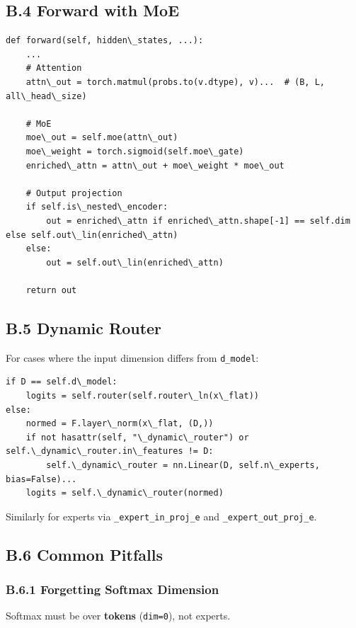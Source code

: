 \subsection{B.4 Forward with MoE}

\begin{lstlisting}
def forward(self, hidden\_states, ...):
    ...
    # Attention
    attn\_out = torch.matmul(probs.to(v.dtype), v)...  # (B, L, all\_head\_size)
    
    # MoE
    moe\_out = self.moe(attn\_out)
    moe\_weight = torch.sigmoid(self.moe\_gate)
    enriched\_attn = attn\_out + moe\_weight * moe\_out
    
    # Output projection
    if self.is\_nested\_encoder:
        out = enriched\_attn if enriched\_attn.shape[-1] == self.dim else self.out\_lin(enriched\_attn)
    else:
        out = self.out\_lin(enriched\_attn)
    
    return out
\end{lstlisting}

\subsection{B.5 Dynamic Router}

For cases where the input dimension differs from \texttt{d\_model}:

\begin{lstlisting}
if D == self.d\_model:
    logits = self.router(self.router\_ln(x\_flat))
else:
    normed = F.layer\_norm(x\_flat, (D,))
    if not hasattr(self, "\_dynamic\_router") or self.\_dynamic\_router.in\_features != D:
        self.\_dynamic\_router = nn.Linear(D, self.n\_experts, bias=False)...
    logits = self.\_dynamic\_router(normed)
\end{lstlisting}

Similarly for experts via \texttt{\_expert\_in\_proj\_{e}} and \texttt{\_expert\_out\_proj\_{e}}.

\subsection{B.6 Common Pitfalls}

\subsubsection{B.6.1 Forgetting Softmax Dimension}

Softmax must be over \textbf{tokens} (\texttt{dim=0}), not experts.

